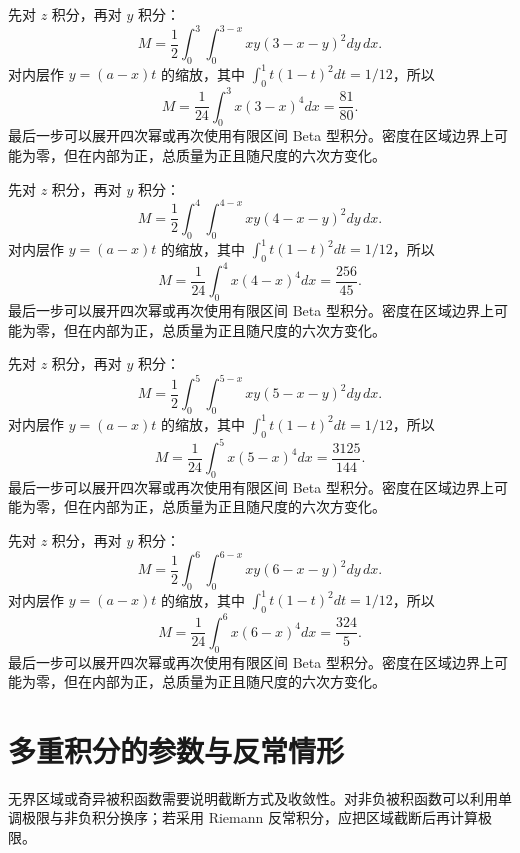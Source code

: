 \documentclass[UTF8,12pt,a4paper,fontset=fandol]{ctexart}
\begin{document}
\begin{solve}\label{ans:c39q21}
先对 $z$ 积分，再对 $y$ 积分：
\[
M=\frac12\int_0^{3}\int_0^{3-x}xy(3-x-y)^2dy\,dx.
\]
对内层作 $y=(a-x)t$ 的缩放，其中 $\int_0^1t(1-t)^2dt=1/12$，所以
\[
M=\frac1{24}\int_0^{3}x(3-x)^4dx=\frac{81}{80}.
\]
最后一步可以展开四次幂或再次使用有限区间 Beta 型积分。密度在区域边界上可能为零，但在内部为正，总质量为正且随尺度的六次方变化。
\end{solve}

\begin{solve}\label{ans:c39q22}
先对 $z$ 积分，再对 $y$ 积分：
\[
M=\frac12\int_0^{4}\int_0^{4-x}xy(4-x-y)^2dy\,dx.
\]
对内层作 $y=(a-x)t$ 的缩放，其中 $\int_0^1t(1-t)^2dt=1/12$，所以
\[
M=\frac1{24}\int_0^{4}x(4-x)^4dx=\frac{256}{45}.
\]
最后一步可以展开四次幂或再次使用有限区间 Beta 型积分。密度在区域边界上可能为零，但在内部为正，总质量为正且随尺度的六次方变化。
\end{solve}

\begin{solve}\label{ans:c39q23}
先对 $z$ 积分，再对 $y$ 积分：
\[
M=\frac12\int_0^{5}\int_0^{5-x}xy(5-x-y)^2dy\,dx.
\]
对内层作 $y=(a-x)t$ 的缩放，其中 $\int_0^1t(1-t)^2dt=1/12$，所以
\[
M=\frac1{24}\int_0^{5}x(5-x)^4dx=\frac{3125}{144}.
\]
最后一步可以展开四次幂或再次使用有限区间 Beta 型积分。密度在区域边界上可能为零，但在内部为正，总质量为正且随尺度的六次方变化。
\end{solve}

\begin{solve}\label{ans:c39q24}
先对 $z$ 积分，再对 $y$ 积分：
\[
M=\frac12\int_0^{6}\int_0^{6-x}xy(6-x-y)^2dy\,dx.
\]
对内层作 $y=(a-x)t$ 的缩放，其中 $\int_0^1t(1-t)^2dt=1/12$，所以
\[
M=\frac1{24}\int_0^{6}x(6-x)^4dx=\frac{324}{5}.
\]
最后一步可以展开四次幂或再次使用有限区间 Beta 型积分。密度在区域边界上可能为零，但在内部为正，总质量为正且随尺度的六次方变化。
\end{solve}

\clearpage
\section{多重积分的参数与反常情形}\label{sec:ch40}
无界区域或奇异被积函数需要说明截断方式及收敛性。对非负被积函数可以利用单调极限与非负积分换序；若采用 Riemann 反常积分，应把区域截断后再计算极限。
\end{document}
